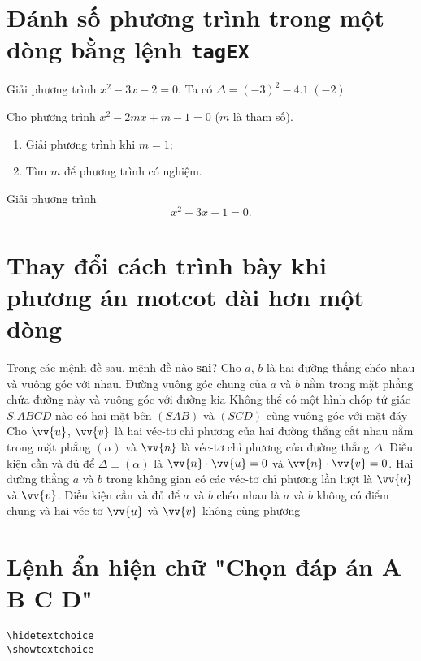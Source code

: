 \documentclass[12pt,a4paper,oneside]{article}
\def\vec{\vv}
\begin{document}
\section{Đánh số phương trình trong một dòng bằng lệnh \texttt{tagEX}}
\begin{ex}
	Giải phương trình $x^2-3x-2=0$.
	\loigiai
	{
Ta có $\Delta=(-3)^2-4.1.(-2)$
	}
\end{ex}
\begin{ex}
Cho phương trình $x^2-2mx+m-1=0$ ($m$ là tham số). 
\begin{enumerate}
\item Giải phương trình khi $m=1$;
\item Tìm $m$ để phương trình có nghiệm.
\end{enumerate}
\end{ex}
\begin{ex}
	Giải phương trình 
\begin{equation*}
x^2-3x+1=0.\tag{3}
\end{equation*}
\end{ex}
\section{Thay đổi cách trình bày khi phương án motcot dài hơn một dòng}
\begin{ex}%
	Trong các mệnh đề sau, mệnh đề nào \textbf{sai}?
	\choice
	{\True Cho $a$, $b$ là hai đường thẳng chéo nhau và vuông góc với nhau. Đường vuông góc chung của $a$ và $b$ nằm trong mặt phẳng chứa đường này và vuông góc với đường kia}
	{Không thể có một hình chóp tứ giác $S.ABCD$ nào có hai mặt bên $(SAB)$ và $(SCD)$ cùng vuông góc với mặt đáy}
	{Cho $\vec{u}$, $\vec{v}$ là hai véc-tơ chỉ phương của hai đường thẳng cắt nhau nằm trong mặt phẳng $(\alpha)$ và $\vec{n}$ là véc-tơ chỉ phương của đường thẳng $\Delta$. Điều kiện cần và đủ để $\Delta\perp(\alpha)$ là $\vec{n}\cdot\vec{u}=0$ và $\vec{n}\cdot\vec{v}=0$.} 
	{Hai đường thẳng $a$ và $b$ trong không gian có các véc-tơ chỉ phương lần lượt là $\vec{u}$ và $\vec{v}$. Điều kiện cần và đủ để $a$ và $b$ chéo nhau là $a$ và $b$ không có điểm chung và hai véc-tơ $\vec{u}$ và $\vec{v}$ không cùng phương}
\end{ex}
\section{Lệnh ẩn hiện chữ "Chọn đáp án A B C D"}
\begin{verbatim}
\hidetextchoice
\showtextchoice
\end{verbatim}
\end{document}
